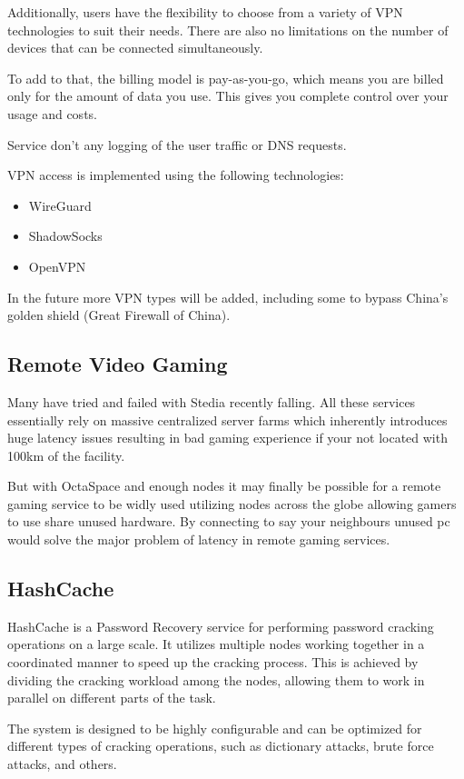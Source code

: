 Additionally, users have the flexibility to choose from a variety of VPN technologies to suit their needs.
There are also no limitations on the number of devices that can be connected simultaneously.

To add to that, the billing model is pay-as-you-go, which means you are billed only for the amount of data you use.
This gives you complete control over your usage and costs.

Service don’t any logging of the user traffic or DNS requests.

VPN access is implemented using the following technologies:

\begin{itemize}
    \item WireGuard
    \item ShadowSocks
    \item OpenVPN
\end{itemize}

In the future more VPN types will be added, including some to bypass China's golden shield (Great Firewall of China).
\subsection{Remote Video Gaming}

Many have tried and failed with Stedia recently falling. All these services essentially rely on massive centralized server farms which inherently introduces huge latency issues resulting in bad gaming experience if your not located with 100km of the facility.

But with OctaSpace and enough nodes it may finally be possible for a remote gaming service to be widly used utilizing nodes across the globe allowing gamers to use share unused hardware. By connecting to say your neighbours unused pc would solve the major problem of latency in remote gaming services.

\subsection{HashCache}

HashCache is a Password Recovery service for performing password cracking operations on a large scale. It utilizes multiple nodes working together in a coordinated manner to speed up the cracking process. This is achieved by dividing the cracking workload among the nodes, allowing them to work in parallel on different parts of the task.

The system is designed to be highly configurable and can be optimized for different types of cracking operations, such as dictionary attacks, brute force attacks, and others.

